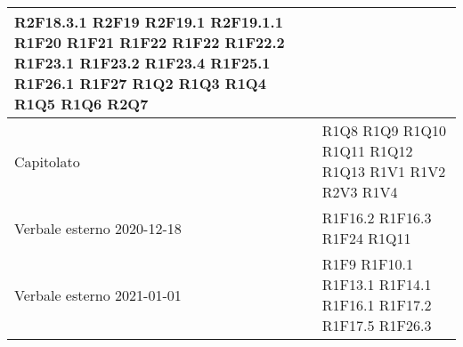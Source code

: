 \begin{center}
\begin{longtable}{|p{44mm}|p{22mm}|}
R2F18.3.1 \newline
R2F19 \newline
R2F19.1 \newline
R2F19.1.1 \newline
R1F20 \newline
R1F21 \newline
R1F22 \newline
R1F22 \newline
R1F22.2 \newline
R1F23.1 \newline
R1F23.2 \newline
R1F23.4 \newline
R1F25.1 \newline
R1F26.1 \newline
R1F27 \newline
R1Q2 \newline
R1Q3 \newline
R1Q4 \newline
R1Q5 \newline
R1Q6 \newline
R2Q7 
\\
\hline
Capitolato &
R1Q8 \newline
R1Q9 \newline
R1Q10 \newline
R1Q11 \newline
R1Q12 \newline
R1Q13 \newline
R1V1 \newline
R1V2 \newline
R2V3 \newline
R1V4 \newline
\\
\hline
Verbale esterno 2020-12-18 &
R1F16.2 \newline
R1F16.3 \newline
R1F24 \newline
R1Q11 \newline
\\
\hline
Verbale esterno 2021-01-01 &
R1F9 \newline
R1F10.1 \newline
R1F13.1 \newline
R1F14.1 \newline
R1F16.1 \newline
R1F17.2 \newline
R1F17.5 \newline
R1F26.3 \newline
\\

\end{longtable}
\end{center}

